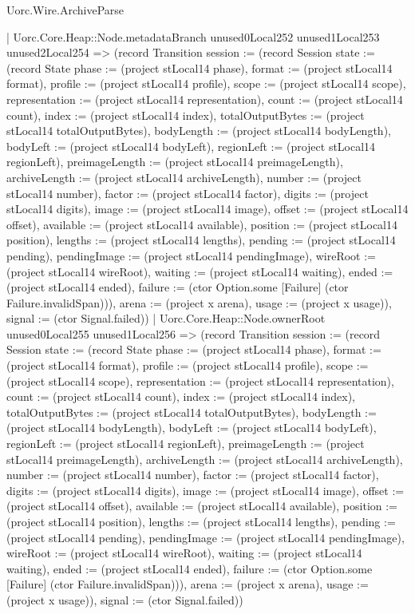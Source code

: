 \begin{lexlean}{Uorc.Wire.ArchiveParse}
\begin{semanticmodule}
{            | Uorc.Core.Heap::Node.metadataBranch unused0Local252 unused1Local253 unused2Local254 => (record Transition {session := (record Session {state := (record State {phase := (project stLocal14 phase), format := (project stLocal14 format), profile := (project stLocal14 profile), scope := (project stLocal14 scope), representation := (project stLocal14 representation), count := (project stLocal14 count), index := (project stLocal14 index), totalOutputBytes := (project stLocal14 totalOutputBytes), bodyLength := (project stLocal14 bodyLength), bodyLeft := (project stLocal14 bodyLeft), regionLeft := (project stLocal14 regionLeft), preimageLength := (project stLocal14 preimageLength), archiveLength := (project stLocal14 archiveLength), number := (project stLocal14 number), factor := (project stLocal14 factor), digits := (project stLocal14 digits), image := (project stLocal14 image), offset := (project stLocal14 offset), available := (project stLocal14 available), position := (project stLocal14 position), lengths := (project stLocal14 lengths), pending := (project stLocal14 pending), pendingImage := (project stLocal14 pendingImage), wireRoot := (project stLocal14 wireRoot), waiting := (project stLocal14 waiting), ended := (project stLocal14 ended), failure := (ctor Option.some [Failure] (ctor Failure.invalidSpan))}), arena := (project x arena), usage := (project x usage)}), signal := (ctor Signal.failed)})
            | Uorc.Core.Heap::Node.ownerRoot unused0Local255 unused1Local256 => (record Transition {session := (record Session {state := (record State {phase := (project stLocal14 phase), format := (project stLocal14 format), profile := (project stLocal14 profile), scope := (project stLocal14 scope), representation := (project stLocal14 representation), count := (project stLocal14 count), index := (project stLocal14 index), totalOutputBytes := (project stLocal14 totalOutputBytes), bodyLength := (project stLocal14 bodyLength), bodyLeft := (project stLocal14 bodyLeft), regionLeft := (project stLocal14 regionLeft), preimageLength := (project stLocal14 preimageLength), archiveLength := (project stLocal14 archiveLength), number := (project stLocal14 number), factor := (project stLocal14 factor), digits := (project stLocal14 digits), image := (project stLocal14 image), offset := (project stLocal14 offset), available := (project stLocal14 available), position := (project stLocal14 position), lengths := (project stLocal14 lengths), pending := (project stLocal14 pending), pendingImage := (project stLocal14 pendingImage), wireRoot := (project stLocal14 wireRoot), waiting := (project stLocal14 waiting), ended := (project stLocal14 ended), failure := (ctor Option.some [Failure] (ctor Failure.invalidSpan))}), arena := (project x arena), usage := (project x usage)}), signal := (ctor Signal.failed)})
}
\end{semanticmodule}
\end{lexlean}
